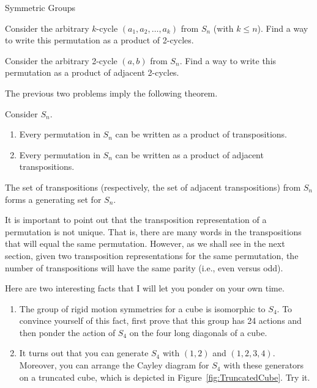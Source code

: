 \begin{section}{Symmetric Groups}
\begin{problem}
Consider the arbitrary $k$-cycle $(a_1,a_2,\ldots, a_k)$ from $S_n$ (with $k\leq n$).  Find a way to write this permutation as a product of 2-cycles. 
\end{problem}

\begin{problem}
Consider the arbitrary 2-cycle $(a,b)$ from $S_n$.  Find a way to write this permutation as a product of adjacent 2-cycles.
\end{problem}

The previous two problems imply the following theorem.

\begin{theorem}
Consider $S_n$.
\begin{enumerate}[label=\textrm{(\alph*)}]
\item Every permutation in $S_n$ can be written as a product of transpositions.
\item Every permutation in $S_n$ can be written as a product of adjacent transpositions.
\end{enumerate}
\end{theorem}

\begin{corollary}
The set of transpositions (respectively, the set of adjacent transpositions) from $S_n$ forms a generating set for $S_n$.
\end{corollary}

It is important to point out that the transposition representation of a permutation is not unique.  That is, there are many words in the transpositions that will equal the same permutation.  However, as we shall see in the next section, given two transposition representations for the same permutation, the number of transpositions will have the same parity (i.e., even versus odd).

\begin{remark}
Here are two interesting facts that I will let you ponder on your own time.
\begin{enumerate}[label=\textrm{(\alph*)}]
\item The group of rigid motion symmetries for a cube is isomorphic to $S_4$.  To convince yourself of this fact, first prove that this group has 24 actions and then ponder the action of $S_4$ on the four long diagonals of a cube.
\item It turns out that you can generate $S_4$ with $(1,2)$ and $(1,2,3,4)$.  Moreover, you can arrange the Cayley diagram for $S_4$ with these generators on a truncated cube, which is depicted in Figure~\ref{fig:TruncatedCube}.  Try it. 
\end{enumerate}
\end{remark}


\end{section}
